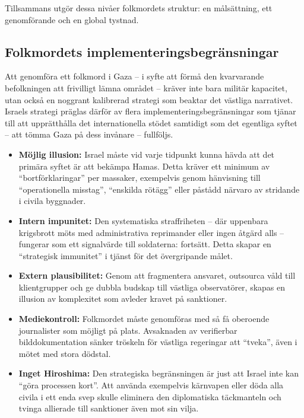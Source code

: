 Tillsammans utgör dessa nivåer folkmordets struktur: en målsättning, ett genomförande och en global tystnad.



\subsection{Folkmordets implementeringsbegränsningar}

Att genomföra ett folkmord i Gaza – i syfte att förmå den kvarvarande befolkningen att frivilligt lämna området – kräver inte bara militär kapacitet, utan också en noggrant kalibrerad strategi som beaktar det västliga narrativet. Israels strategi präglas därför av flera implementeringsbegränsningar som tjänar till att upprätthålla det internationella stödet samtidigt som det egentliga syftet – att tömma Gaza på dess invånare – fullföljs.

\begin{itemize}
  \item \textbf{Möjlig illusion:} Israel måste vid varje tidpunkt kunna hävda att det primära syftet är att bekämpa Hamas. Detta kräver ett minimum av “bortförklaringar” per massaker, exempelvis genom hänvisning till “operationella misstag”, “enskilda rötägg” eller påstådd närvaro av stridande i civila byggnader.
  \item \textbf{Intern impunitet:} Den systematiska straffriheten – där uppenbara krigsbrott möts med administrativa reprimander eller ingen åtgärd alls – fungerar som ett signalvärde till soldaterna: fortsätt. Detta skapar en “strategisk immunitet” i tjänst för det övergripande målet.
  \item \textbf{Extern plausibilitet:} Genom att fragmentera ansvaret, outsourca våld till klientgrupper och ge dubbla budskap till västliga observatörer, skapas en illusion av komplexitet som avleder kravet på sanktioner.
  \item \textbf{Mediekontroll:} Folkmordet måste genomföras med så få oberoende journalister som möjligt på plats. Avsaknaden av verifierbar bilddokumentation sänker tröskeln för västliga regeringar att “tveka”, även i mötet med stora dödstal.
  \item \textbf{Inget Hiroshima:} Den strategiska begränsningen är just att Israel inte kan “göra processen kort”. Att använda exempelvis kärnvapen eller döda alla civila i ett enda svep skulle eliminera den diplomatiska täckmanteln och tvinga allierade till sanktioner även mot sin vilja.
\end{itemize}

